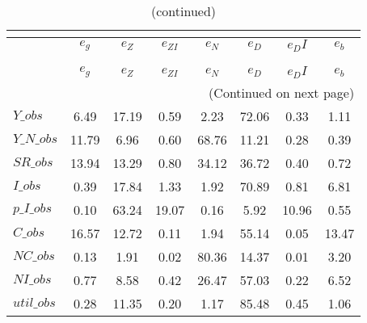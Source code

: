  
\begin{center}
\begin{longtable}{lccccccc} 
\caption{VARIANCE DECOMPOSITION (in percent)}\\
 \label{Table:th_var_decomp_uncond}\\
\toprule 
$           $	 & 	 $       {e_g}$	 & 	 $       {e_Z}$	 & 	 $    {e_{ZI}}$	 & 	 $       {e_N}$	 & 	 $       {e_D}$	 & 	 $      {e_DI}$	 & 	 $       {e_b}$\\
\midrule \endfirsthead 
\caption{(continued)}\\
 \toprule \\ 
$           $	 & 	 $       {e_g}$	 & 	 $       {e_Z}$	 & 	 $    {e_{ZI}}$	 & 	 $       {e_N}$	 & 	 $       {e_D}$	 & 	 $      {e_DI}$	 & 	 $       {e_b}$\\
\midrule \endhead 
\midrule \multicolumn{8}{r}{(Continued on next page)} \\ \bottomrule \endfoot 
\bottomrule \endlastfoot 
$Y\_obs     $	 & 	        6.49	 & 	       17.19	 & 	        0.59	 & 	        2.23	 & 	       72.06	 & 	        0.33	 & 	        1.11 \\ 
$Y\_N\_obs  $	 & 	       11.79	 & 	        6.96	 & 	        0.60	 & 	       68.76	 & 	       11.21	 & 	        0.28	 & 	        0.39 \\ 
$SR\_obs    $	 & 	       13.94	 & 	       13.29	 & 	        0.80	 & 	       34.12	 & 	       36.72	 & 	        0.40	 & 	        0.72 \\ 
$I\_obs     $	 & 	        0.39	 & 	       17.84	 & 	        1.33	 & 	        1.92	 & 	       70.89	 & 	        0.81	 & 	        6.81 \\ 
$p\_I\_obs  $	 & 	        0.10	 & 	       63.24	 & 	       19.07	 & 	        0.16	 & 	        5.92	 & 	       10.96	 & 	        0.55 \\ 
$C\_obs     $	 & 	       16.57	 & 	       12.72	 & 	        0.11	 & 	        1.94	 & 	       55.14	 & 	        0.05	 & 	       13.47 \\ 
$NC\_obs    $	 & 	        0.13	 & 	        1.91	 & 	        0.02	 & 	       80.36	 & 	       14.37	 & 	        0.01	 & 	        3.20 \\ 
$NI\_obs    $	 & 	        0.77	 & 	        8.58	 & 	        0.42	 & 	       26.47	 & 	       57.03	 & 	        0.22	 & 	        6.52 \\ 
$util\_obs  $	 & 	        0.28	 & 	       11.35	 & 	        0.20	 & 	        1.17	 & 	       85.48	 & 	        0.45	 & 	        1.06 \\ 

\end{longtable}
\end{center}
